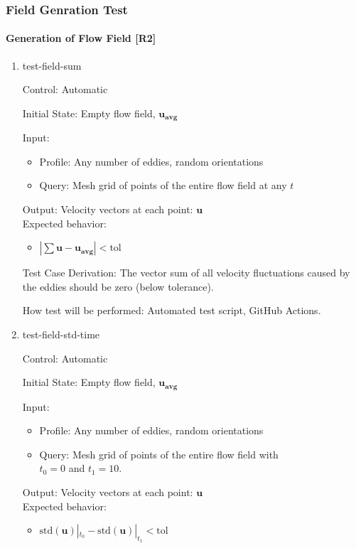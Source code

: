 \documentclass[12pt, titlepage]{article}
\begin{document}
\newpage
\subsubsection{Field Genration Test} \label{FieldGenTest}
\paragraph{Generation of Flow Field [R2]}

\begin{enumerate}

  \item{test-field-sum\\}

  Control: Automatic
            
  Initial State: Empty flow field, $\mathbf{u_{avg}}$
            
  Input:
  \begin{itemize}
    \item Profile: Any number of eddies, random orientations
    \item Query: Mesh grid of points of the entire flow field at any $t$
  \end{itemize}
  Output: Velocity vectors at each point: $\mathbf{u}$\\
  Expected behavior:
  \begin{itemize}
    \item $|\sum\mathbf{u}-\mathbf{u_{avg}}| < \text{tol}$
  \end{itemize}

  Test Case Derivation: The vector sum of all velocity fluctuations caused by the eddies should be zero (below tolerance).
            
  How test will be performed: Automated test script, GitHub Actions.

  \item{test-field-std-time\\}

  Control: Automatic
            
  Initial State: Empty flow field, $\mathbf{u_{avg}}$
            
  Input:
  \begin{itemize}
    \item Profile: Any number of eddies, random orientations
    \item Query: Mesh grid of points of the entire flow field with \\ $t_0=0$ and $t_1=10$.
  \end{itemize}
  Output: Velocity vectors at each point: $\mathbf{u}$\\
  Expected behavior:
  \begin{itemize}
    \item $\text{std}(\mathbf{u})|_{t_0} - \text{std}(\mathbf{u})|_{t_1} < \text{tol}$
  \end{itemize}


\end{enumerate}
\end{document}
